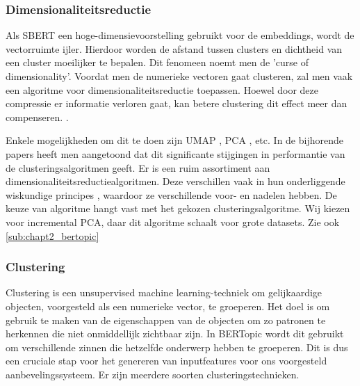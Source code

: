 \subsubsection{Dimensionaliteitsreductie}
Als SBERT een hoge-dimensievoorstelling gebruikt voor de embeddings, wordt de vectorruimte ijler. Hierdoor worden de afstand tussen clusters en dichtheid van een cluster moeilijker te bepalen.  Dit fenomeen noemt men de 'curse of dimensionality'. \cite{curse_of_dim, high_dim_problem} Voordat men de numerieke vectoren gaat clusteren, zal men vaak een algoritme voor dimensionaliteitsreductie toepassen. Hoewel door deze compressie er informatie verloren gaat, kan betere clustering dit effect meer dan compenseren. \cite{dim_reduction_summary}.

Enkele mogelijkheden om dit te doen zijn UMAP \cite{paper_umap}, PCA \cite{paper_pca}, etc.
In de bijhorende papers heeft men aangetoond dat dit significante stijgingen in performantie van de clusteringsalgoritmen geeft. 
Er is een ruim assortiment \cite{dim_reduction_options} aan dimensionaliteitsreductiealgoritmen. Deze verschillen vaak in hun onderliggende wiskundige principes \cite{dim_reduction_summary}, waardoor ze verschillende voor- en nadelen hebben. De keuze van algoritme hangt vast met het gekozen clusteringsalgoritme. Wij kiezen voor incremental PCA, daar dit algoritme schaalt voor grote datasets. Zie ook \autoref{sub:chapt2_bertopic}

\subsubsection{Clustering}
\label{sub:chapt2_bertopic_clustering}
Clustering is een unsupervised machine learning-techniek om gelijkaardige objecten, voorgesteld als een numerieke vector, te groeperen. Het doel is om gebruik te maken van de eigenschappen van de objecten om zo patronen te herkennen die niet onmiddellijk zichtbaar zijn. In BERTopic wordt dit gebruikt om verschillende zinnen die hetzelfde onderwerp hebben te groeperen. Dit is dus een cruciale stap voor het genereren van inputfeatures voor ons voorgesteld aanbevelingssysteem. Er zijn meerdere soorten clusteringstechnieken. \cite{clustering_types_of}

